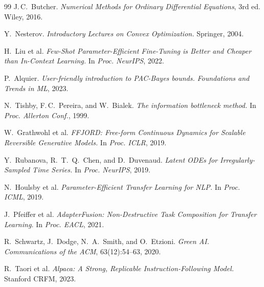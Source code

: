 \documentclass{scpe}
\begin{document}
\begin{thebibliography}{99}
J.\,C.~Butcher.
\textit{Numerical Methods for Ordinary Differential Equations}, 3rd ed.
Wiley, 2016.

Y.~Nesterov.
\textit{Introductory Lectures on Convex Optimization.}
Springer, 2004.

H.~Liu et al.
\textit{Few-Shot Parameter-Efficient Fine-Tuning is Better and Cheaper than In-Context Learning.}
In \textit{Proc. NeurIPS}, 2022.

P.~Alquier.
\textit{User-friendly introduction to PAC-Bayes bounds.}
\textit{Foundations and Trends in ML}, 2023.

N.~Tishby, F.\,C.~Pereira, and W.~Bialek.
\textit{The information bottleneck method.}
In \textit{Proc. Allerton Conf.}, 1999.

W.~Grathwohl et al.
\textit{FFJORD: Free-form Continuous Dynamics for Scalable Reversible Generative Models.}
In \textit{Proc. ICLR}, 2019.

Y.~Rubanova, R.~T.~Q.~Chen, and D.~Duvenaud.
\textit{Latent ODEs for Irregularly-Sampled Time Series.}
In \textit{Proc. NeurIPS}, 2019.

N.~Houlsby et al.
\textit{Parameter-Efficient Transfer Learning for NLP.}
In \textit{Proc. ICML}, 2019.

J.~Pfeiffer et al.
\textit{AdapterFusion: Non-Destructive Task Composition for Transfer Learning.}
In \textit{Proc. EACL}, 2021.

R.~Schwartz, J.~Dodge, N.~A.~Smith, and O.~Etzioni.
\textit{Green AI.}
\textit{Communications of the ACM}, 63(12):54--63, 2020.

R.~Taori et al.
\textit{Alpaca: A Strong, Replicable Instruction-Following Model.}
Stanford CRFM, 2023.

\end{thebibliography}
\end{document}
